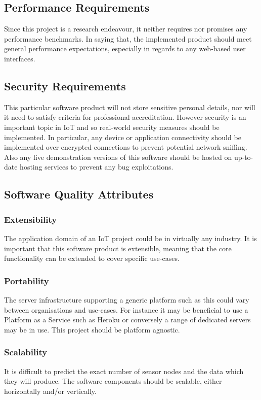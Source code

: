     \subsection{Performance Requirements}
      Since this project is a research endeavour, it neither requires nor promises any performance benchmarks. In saying that, the implemented product should meet general performance expectations, especially in regards to any web-based user interfaces.

    \subsection{Security Requirements}
      This particular software product will not store sensitive personal details, nor will it need to satisfy criteria for professional accreditation. However security is an important topic in IoT and so real-world security measures should be implemented. In particular, any device or application connectivity should be implemented over encrypted connections to prevent potential network sniffing. Also any live demonstration versions of this software should be hosted on up-to-date hosting services to prevent any bug exploitations.

    \subsection{Software Quality Attributes}
      \subsubsection{Extensibility}
        The application domain of an IoT project could be in virtually any industry. It is important that this software product is extensible, meaning that the core functionality can be extended to cover specific use-cases.

      \subsubsection{Portability}
        The server infrastructure supporting a generic platform such as this could vary between organisations and use-cases. For instance it may be beneficial to use a Platform as a Service such as Heroku or conversely a range of dedicated servers may be in use. This project should be platform agnostic. 

      \subsubsection{Scalability}
        It is difficult to predict the exact number of sensor nodes and the data which they will produce. The software components should be scalable, either horizontally and/or vertically.

